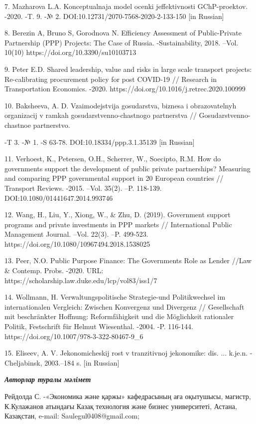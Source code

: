 7. Mazharova L.A. Konceptual\textquotesingle naja
model\textquotesingle{} ocenki jeffektivnosti GChP-proektov. -2020. -T.
9. -№ 2. DOI:10.12731/2070-7568-2020-2-133-150 {[}in Russian{]}

8. Berezin A, Bruno S, Gorodnova N. Efficiency Assessment of
Public-Private Partnership (PPP) Projects: The Case of Russia.
-Sustainability, 2018. --Vol. 10(10) https://doi.org/10.3390/su10103713

9. Peter E.D. Shared leadership, value and risks in large scale
transport projects: Re-calibrating procurement policy for post COVID-19
// Research in Transportation Economics. -2020.
https://doi.org/10.1016/j.retrec.2020.100999

10. Baksheeva, A. D. Vzaimodejstvija gosudarstva, biznesa i
obrazovatel\textquotesingle nyh organizacij v ramkah
gosudarstvenno-chastnogo partnerstva // Gosudarstvenno-chastnoe
partnerstvo.

-T 3. -№ 1. -S 63-78. DOI:10.18334/ppp.3.1.35139 {[}in Russian{]}

11. Verhoest, K., Petersen, O.H., Scherrer, W., Soecipto, R.M. How do
governments support the development of public private partnerships?
Measuring and comparing PPP governmental support in 20 European
countries // Transport Reviews. -2015. --Vol. 35(2). --P. 118-139.
DOI:10.1080/01441647.2014.993746

12. Wang, H., Liu, Y., Xiong, W., \& Zhu, D. (2019). Government support
programs and private investments in PPP markets // International Public
Management Journal. --Vol. 22(3). --P. 499-523.
https://doi.org/10.1080/10967494.2018.1538025

13. Peer, N.O. Public Purpose Finance: The Government\textquotesingle s
Role as Lender //Law \& Contemp. Probs. -2020. URL:
https://scholarship.law.duke.edu/lcp/vol83/iss1/7

14. Wollmann, H. Verwaltungspolitische Strategie-und Politikwechsel im
internationalen Vergleich: Zwischen Konvergenz und Divergenz //
Gesellschaft mit beschränkter Hoffnung: Reformfähigkeit und die
Möglichkeit rationaler Politik, Festschrift für Helmut Wiesenthal.
-2004. -P. 116-144. https://doi.org/10.1007/978-3-322-80467-9\_6

15. Eliseev, A. V. Jekonomicheskij rost v tranzitivnoj jekonomike: dis.
... k.je.n. -Cheljabinsk, 2003.--184 s. {[}in Russian{]}

\emph{{\bfseries Авторлар туралы мәлімет}}

Рейдолда С. -«Экономика және қаржы» кафедрасының аға оқытушысы, магистр,
К.Кулажанов атындағы Казақ технология және бизнес университеті, Астана,
Казақстан, e-mail: Saulegul0408@gmail.com;

